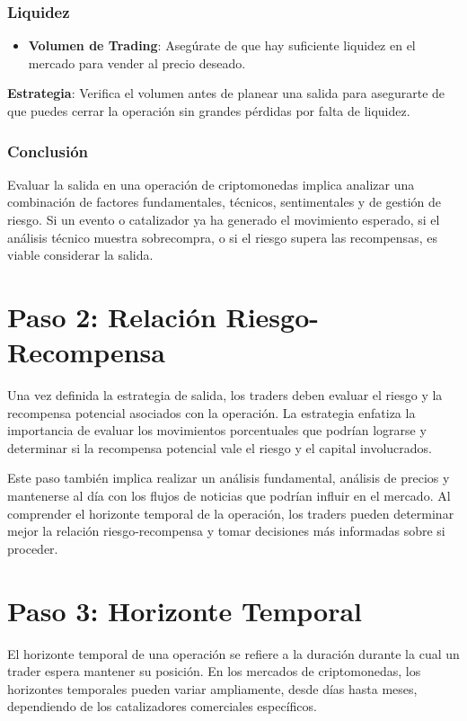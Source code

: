 \documentclass[12pt]{article}
\begin{document}
        \subsubsection{Liquidez}
            \begin{itemize}
                \item \textbf{Volumen de Trading}: Asegúrate de que hay suficiente liquidez en el mercado para vender al precio deseado.
            \end{itemize}

            \textbf{Estrategia}: Verifica el volumen antes de planear una salida para asegurarte de que puedes cerrar la operación sin grandes pérdidas por falta de liquidez.

        \subsubsection{Conclusión}
        Evaluar la salida en una operación de criptomonedas implica analizar una combinación de factores fundamentales, técnicos, sentimentales y de gestión de riesgo. Si un evento o catalizador ya ha generado el movimiento esperado, si el análisis técnico muestra sobrecompra, o si el riesgo supera las recompensas, es viable considerar la salida.
\section{Paso 2: Relación Riesgo-Recompensa}

    Una vez definida la estrategia de salida, los traders deben evaluar el riesgo y la recompensa potencial asociados con la operación. La estrategia enfatiza la importancia de evaluar los movimientos porcentuales que podrían lograrse y determinar si la recompensa potencial vale el riesgo y el capital involucrados.

    Este paso también implica realizar un análisis fundamental, análisis de precios y mantenerse al día con los flujos de noticias que podrían influir en el mercado. Al comprender el horizonte temporal de la operación, los traders pueden determinar mejor la relación riesgo-recompensa y tomar decisiones más informadas sobre si proceder.

\section{Paso 3: Horizonte Temporal}

    El horizonte temporal de una operación se refiere a la duración durante la cual un trader espera mantener su posición. En los mercados de criptomonedas, los horizontes temporales pueden variar ampliamente, desde días hasta meses, dependiendo de los catalizadores comerciales específicos.
\end{document}
